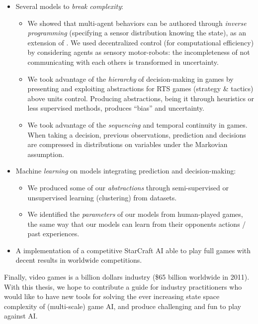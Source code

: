 \begin{itemize}
    \item Several models to \textit{break complexity}:
    \begin{itemize}
        \item We showed that multi-agent behaviors can be authored through \textit{inverse programming} (specifying a sensor distribution knowing the state), as an extension of \citep{theseRonan}. We used decentralized control (for computational efficiency) by considering agents as sensory motor-robots: the incompleteness of not communicating with each others is transformed in uncertainty.
        \item We took advantage of the \textit{hierarchy} of decision-making in games by presenting and exploiting abstractions for RTS games (strategy \& tactics) above units control. Producing abstractions, being it through heuristics or less supervised methods, produces ``bias'' and uncertainty.
        \item We took advantage of the \textit{sequencing} and temporal continuity in games. When taking a decision, previous observations, prediction and decisions are compressed in distributions on variables under the Markovian assumption. %
    \end{itemize}

    \item Machine \textit{learning} on models integrating prediction and decision-making:
    \begin{itemize}
        \item We produced some of our \textit{abstractions} through semi-supervised or unsupervised learning (clustering) from datasets.
        \item We identified the \textit{parameters} of our models from human-played games, the same way that our models can learn from their opponents actions / past experiences.
    \end{itemize}
    \item A implementation of a competitive StarCraft AI able to play full games with decent results in worldwide competitions.

\end{itemize}

Finally, video games is a billion dollars industry (\$65 billion worldwide in 2011). With this thesis, we hope to contribute a guide for industry practitioners who would like to have new tools for solving the ever increasing state space complexity of (multi-scale) game AI, and produce challenging and fun to play against AI.

